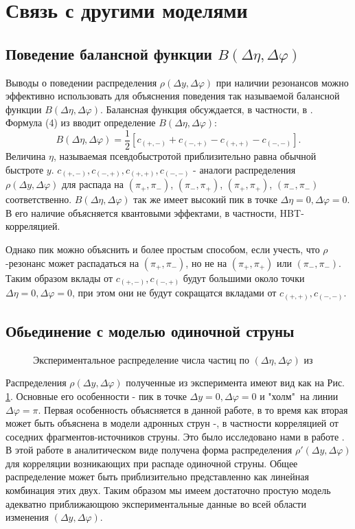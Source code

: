 \documentclass[12pt]{article}
\renewcommand{\l}{\left( }
\renewcommand{\r}{\right) }
\renewcommand{\phi}{\varphi}
\newcommand{\br}[1]{\l {#1} \r}
\def\Dphi{\Delta\phi}
\def\Dy{\Delta y}
\def\Dn{\Delta \eta}
\begin{document}
\section{Связь с другими моделями}
\subsection{Поведение балансной функции $B(\Dn, \Dphi)$}
\qquad Выводы о поведении распределения $\rho(\Dy, \Dphi)$ при наличии резонансов можно эффективно использовать для объяснения поведения так называемой балансной функции $B(\Dn, \Dphi)$. Балансная функция обсуждается, в частности, в \cite{HBT}. Формула (4) из \cite{HBT} вводит определение  $B(\Dn, \Dphi)$:
$$B(\Dn, \Dphi) = \frac{1}{2}[c_{(+,-)} + c_{(-,+)} - c_{(+,+)} - c_{(-,-)}].$$
Величина $\eta$, называемая псевдобыстротой приблизительно равна обычной быстроте $y$. $c_{(+,-)}, c_{(-,+)}, c_{(+,+)}, c_{(-,-)}$ - аналоги распределения $\rho(\Dy, \Dphi)$ для распада на $(\pi_+, \pi_-)$, $(\pi_-, \pi_+)$, $(\pi_+, \pi_+)$, $(\pi_-, \pi_-)$ соответственно. $B(\Dn, \Dphi)$ так же имеет высокий пик в точке $\Dn = 0, \Dphi = 0$. В \cite{HBT} его наличие объясняется квантовыми эффектами, в частности, HBT-корреляцией.

Однако пик можно объяснить и более простым способом, если учесть, что $\rho$-резонанс может распадаться на $(\pi_+, \pi_-)$, но не на $(\pi_+, \pi_+)$ или $(\pi_-, \pi_-)$. Таким образом вклады от $c_{(+,-)}, c_{(-,+)}$ будут большими около точки $\Dn = 0, \Dphi = 0$, при этом они не будут сокращатся вкладами от $c_{(+,+)}, c_{(-,-)}$.

\subsection{Обьединение с моделью одиночной струны}
\begin{figure}
\caption{Экспериментальное распределение числа частиц по $\br{\Delta \eta, \Delta \phi}$ из \cite{exp_data}}
\label{exp}
\end{figure}
\qquad Распределения $\rho (\Dy, \Dphi)$ полученные из эксперимента имеют вид как на Рис. \ref{exp}. Основные его особенности - пик в точке $\Dy = 0, \Dphi = 0$ и "холм"\ на линии $\Dphi = \pi$. Первая особенность объясняется в данной работе, в то время как вторая может быть объяснена в модели адронных струн \cite{model1}-\cite{model4}, в частности корреляцией от соседних фрагментов-источников струны. Это было исследовано нами в работе \cite{bachelor}. В этой работе в аналитическом виде получена форма распределения $\rho' (\Dy, \Dphi)$ для корреляции возникающих при распаде одиночной струны. Общее распределение может быть приблизительно представленно как линейная комбинация этих двух. Таким образом мы имеем достаточно простую модель адекватно приближающюю экспериментальные данные во всей области изменения $(\Dy, \Dphi)$. 
\end{document}
